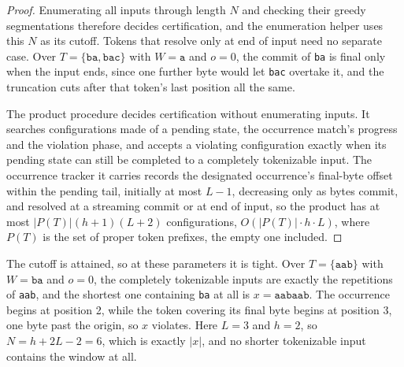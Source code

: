 \documentclass[11pt,a4paper]{article}
\theoremstyle{definition}
\theoremstyle{plain}
\newcommand{\code}[1]{\texttt{#1}}
\begin{document}
\begin{proof}
Enumerating all inputs through length $N$ and checking their greedy segmentations therefore decides certification, and
the enumeration helper uses this $N$ as its cutoff. Tokens that resolve only at end of input need no separate case. Over
$T = \{\code{ba}, \code{bac}\}$ with $W = \code{a}$ and $o = 0$, the commit of \code{ba} is final only when the input
ends, since one further byte would let \code{bac} overtake it, and the truncation cuts after that token's last position
all the same.

The product procedure decides certification without enumerating inputs. It searches configurations made of a pending
state, the occurrence match's progress and the violation phase, and accepts a violating configuration exactly when its
pending state can still be completed to a completely tokenizable input. The occurrence tracker it carries records the
designated occurrence's final-byte offset within the pending tail, initially at most $L - 1$, decreasing only as bytes
commit, and resolved at a streaming commit or at end of input, so the product has at most $|P(T)|(h + 1)(L + 2)$
configurations, $O(|P(T)| \cdot h \cdot L)$, where $P(T)$ is the set of proper token prefixes, the empty one included.
\end{proof}


The cutoff is attained, so at these parameters it is tight. Over $T = \{\code{aab}\}$ with $W = \code{ba}$ and $o = 0$,
the completely tokenizable inputs are exactly the repetitions of \code{aab}, and the shortest one containing \code{ba}
at all is $x = \code{aabaab}$. The occurrence begins at position 2, while the token covering its final byte begins at
position 3, one byte past the origin, so $x$ violates. Here $L = 3$ and $h = 2$, so $N = h + 2L - 2 = 6$, which is
exactly $|x|$, and no shorter tokenizable input contains the window at all.
\end{document}
